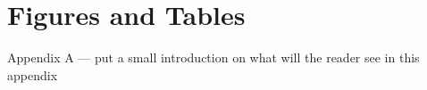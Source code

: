 \appendix
\chapter{Figures and Tables}



Appendix A — put a small introduction on what will the reader see in this appendix

